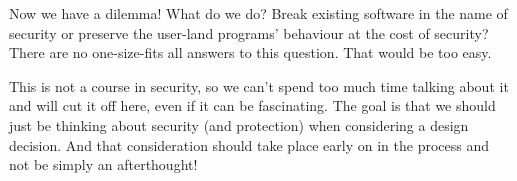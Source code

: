 Now we have a dilemma! What do we do? Break existing software in the name of security or preserve the user-land programs' behaviour at the cost of security? There are no one-size-fits all answers to this question. That would be too easy.

This is not a course in security, so we can't spend too much time talking about it and will cut it off here, even if it can be fascinating. The goal is that we should just be thinking about security (and protection) when considering a design decision. And that consideration should take place early on in the process and not be simply an afterthought!



